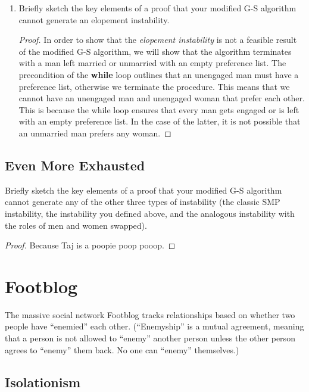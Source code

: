 \documentclass[11pt, oneside]{article}   	%
\theoremstyle{definition}
\theoremstyle{remark}
\begin{document}
\begin{enumerate}
\begin{enumerate}
   \end{enumerate}
	\item Briefly sketch the key elements of a proof that your modified G-S algorithm cannot generate an elopement instability.
	
	\begin{proof}
		In order to show that the \textit{elopement instability} is not a feasible result of the modified G-S algorithm, we will show that the algorithm terminates with a man left married or unmarried  with an empty preference list. The precondition of the \textbf{while} loop outlines that an unengaged man must have a preference list, otherwise we terminate the procedure. This means that we cannot have an unengaged man and unengaged woman that prefer each other. This is because the while loop ensures that every man gets engaged or is left with an empty preference list. In the case of the latter, it is not possible that an unmarried man prefers any woman.
	\end{proof}
\end{enumerate}

\subsection{Even More Exhausted}

Briefly sketch the key elements of a proof that your modified G-S
algorithm cannot generate any of the other three types of instability
(the classic SMP instability, the instability you defined above, and
the analogous instability with the roles of men and women swapped).

\begin{proof}
Because Taj is a poopie poop pooop.
\end{proof}



\cleardoublepage
\section{Footblog}

The massive social network Footblog tracks relationships based on
whether two people have ``enemied'' each other. (``Enemyship'' is a mutual
agreement, meaning that a person is not allowed to ``enemy'' another
person unless the other person agrees to ``enemy'' them back. No one can
``enemy'' themselves.)
\subsection{Isolationism}
\end{document}
